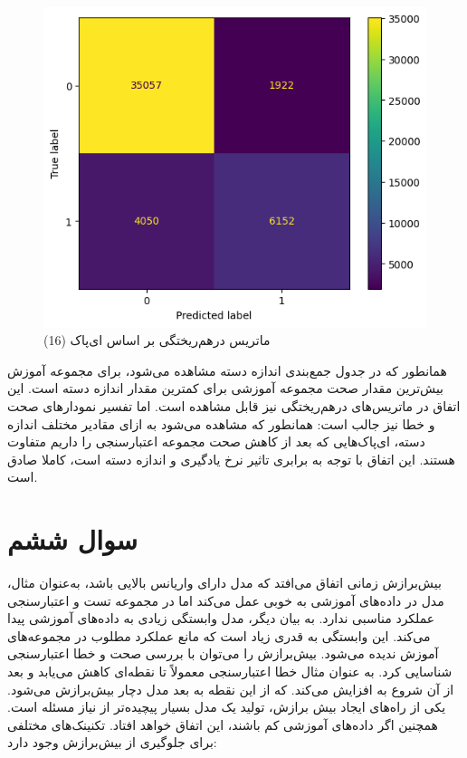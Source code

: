 \documentclass{article}
\begin{document}
\begin{figure}[!h]
    \centering\includegraphics[scale=.55]{./p5-9}
    \caption{ماتریس درهم‌ریختگی بر اساس ای‌پاک (16)}\label{fig.59}
\end{figure}

\cleardoublepage

همانطور که در جدول  جمع‌بندی اندازه دسته مشاهده می‌شود، برای مجموعه آموزش بیش‌ترین مقدار صحت مجموعه آموزشی برای کمترین مقدار اندازه دسته است. این اتفاق در ماتریس‌های درهم‌ریختگی نیز قابل مشاهده است. اما تفسیر نمودارهای صحت و خطا نیز جالب است: همانطور که مشاهده می‌شود به ازای مقادیر مختلف اندازه دسته، ای‌پاک‌هایی که بعد از کاهش صحت مجموعه اعتبارسنجی را داریم متفاوت هستند. این اتفاق با توجه به برابری تاثیر نرخ یادگیری و اندازه دسته است، کاملا صادق است.


\section{سوال ششم}

بیش‌برازش زمانی اتفاق می‌افتد که مدل دارای واریانس بالایی باشد، به‌عنوان مثال، مدل در داده‌های آموزشی به خوبی عمل می‌کند اما در مجموعه تست و اعتبارسنجی عملکرد مناسبی ندارد. به بیان دیگر، مدل وابستگی زیادی به داده‌های آموزشی پیدا می‌کند. این وابستگی به قدری زیاد است که مانع عملکرد مطلوب در مجموعه‌های آموزش ندیده می‌شود.
بیش‌برازش را می‌توان با بررسی صحت و خطا اعتبارسنجی شناسایی کرد. به عنوان مثال خطا اعتبارسنجی معمولاً تا نقطه‌ای کاهش می‌یابد و بعد از آن شروع به افزایش می‌کند. که از این نقطه به بعد مدل دچار بیش‌برازش می‌شود. یکی از راه‌های ایجاد بیش برازش، تولید یک مدل بسیار پیچیده‌تر از نیاز مسئله است. همچنین اگر داده‌های آموزشی کم باشند، این اتفاق خواهد افتاد. 
تکنینک‌های مختلفی برای جلوگیری از بیش‌برازش وجود دارد: 
\end{document}
